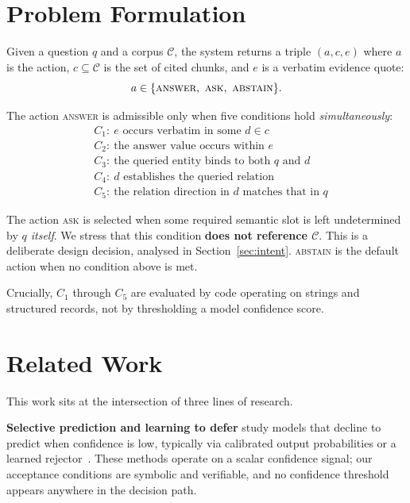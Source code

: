 \documentclass[conference]{IEEEtran}
\newcommand{\ACT}[1]{\textsc{#1}}
\begin{document}
\section{Problem Formulation}
\label{sec:formulation}

Given a question $q$ and a corpus $\mathcal{C}$, the system returns a triple
$(a, c, e)$ where $a$ is the action, $c \subseteq \mathcal{C}$ is the set of cited
chunks, and $e$ is a verbatim evidence quote:
\begin{equation}
a \in \{\ACT{answer},\ \ACT{ask},\ \ACT{abstain}\}.
\end{equation}

The action \ACT{answer} is admissible only when five conditions hold
\emph{simultaneously}:
\begin{align}
&C_1:\ e \text{ occurs verbatim in some } d \in c \label{eq:c1}\\
&C_2:\ \text{the answer value occurs within } e \label{eq:c2}\\
&C_3:\ \text{the queried entity binds to both } q \text{ and } d \label{eq:c3}\\
&C_4:\ d \text{ establishes the queried relation} \label{eq:c4}\\
&C_5:\ \text{the relation direction in } d \text{ matches that in } q \label{eq:c5}
\end{align}

The action \ACT{ask} is selected when some required semantic slot is left
undetermined by \emph{$q$ itself}. We stress that this condition
\textbf{does not reference $\mathcal{C}$}. This is a deliberate design decision,
analysed in Section~\ref{sec:intent}. \ACT{abstain} is the default action when no
condition above is met.

Crucially, $C_1$ through $C_5$ are evaluated by code operating on strings and
structured records, not by thresholding a model confidence score.

\section{Related Work}

This work sits at the intersection of three lines of research.

\textbf{Selective prediction and learning to defer} study models that decline to
predict when confidence is low, typically via calibrated output probabilities or
a learned rejector~\cite{selective}. These methods operate on a scalar confidence
signal; our acceptance conditions are symbolic and verifiable, and no confidence
threshold appears anywhere in the decision path.
\end{document}
